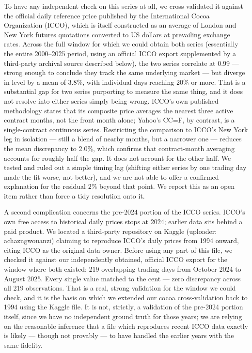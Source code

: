 \documentclass[preprint,12pt,authoryear]{elsarticle}
\begin{document}
To have any independent check on this series at all, we cross-validated
it against the official daily reference price published by the
International Cocoa Organization (ICCO), which is itself constructed
as an average of London and New York futures quotations converted to
US dollars at prevailing exchange rates. Across the full window for
which we could obtain both series (essentially the entire 2000--2025
period, using an official ICCO export supplemented by a third-party
archival source described below), the two series correlate at 0.99 —
strong enough to conclude they track the same underlying market — but
diverge in level by a mean of 3.8\%, with individual days reaching
20\% or more. That is a substantial gap for two series purporting to
measure the same thing, and it does not resolve into either series
simply being wrong. ICCO's own published methodology states that its
composite price averages the nearest three active contract months,
not the front month alone; Yahoo's CC=F, by contrast, is a single-contract
continuous series. Restricting the comparison to ICCO's New York leg
in isolation — still a blend of nearby months, but a narrower one —
reduces the mean discrepancy to 2.0\%, which confirms that
contract-month averaging accounts for roughly half the gap. It does
not account for the other half. We tested and ruled out a simple
timing lag (shifting either series by one trading day made the fit
worse, not better), and we are not able to offer a confirmed
explanation for the residual 2\% beyond that point. We report this as
an open item rather than force a tidy resolution onto it.

A second complication concerns the pre-2024 portion of the ICCO
series. ICCO's own free access to historical daily prices stops at
2024; earlier data sits behind a paid product. We located a
third-party repository on Kaggle (uploader: achazngwouanzi) claiming
to reproduce ICCO's daily prices from 1994 onward, citing ICCO as the
original data owner. Before using any part of this file, we checked
it against our independently obtained, official ICCO export for the
window where both existed: 219 overlapping trading days from October
2024 to August 2025. Every single value matched to the cent — zero
discrepancy across all 219 observations. That is a real, strong
validation for the window we could check, and it is the basis on
which we extended our cocoa cross-validation back to 1994 using the
Kaggle file. It is not, strictly, a validation of the pre-2024 portion
itself, since we have no independent ground truth for those years; we
are relying on the reasonable inference that a file which reproduces
recent ICCO data exactly is likely — though not provably — to have
handled the earlier years with the same fidelity.
\end{document}
